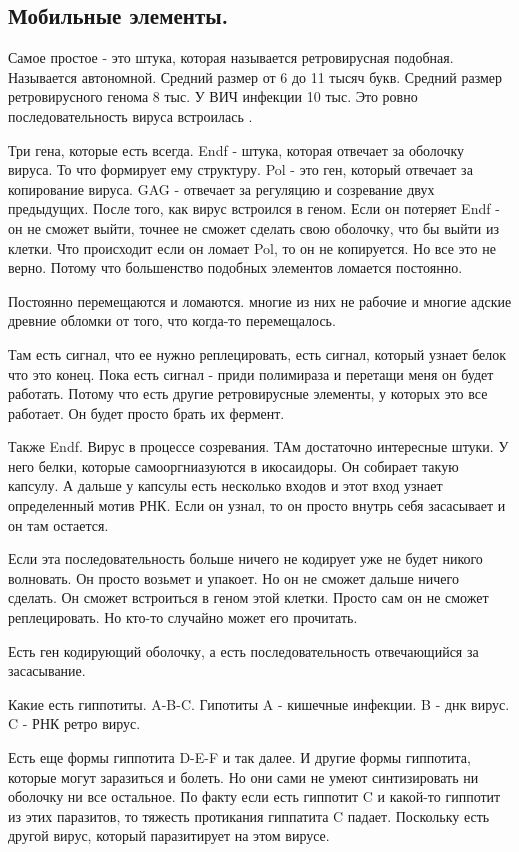 \subsection{Мобильные элементы.} 

Самое простое - это штука, которая называется 
ретровирусная подобная. Называется автономной. 
Средний размер от 6 до 11 тысяч букв. Средний 
размер ретровирусного генома 8 тыс. У ВИЧ 
инфекции 10 тыс. Это ровно последовательность 
вируса встроилась . 

Три гена, которые есть всегда. Endf - штука, 
которая отвечает за оболочку вируса. То что формирует ему структуру. 
Pol - это ген, который отвечает за копирование вируса. GAG - отвечает 
за регуляцию и созревание двух предыдущих. После того, 
как вирус встроился в геном. Если он потеряет Endf - он не 
сможет выйти, точнее не сможет сделать свою 
оболочку, что бы выйти из клетки. Что происходит если он 
ломает Pol, то он не копируется. Но все это не верно. 
Потому что большенство подобных элементов ломается постоянно. 

Постоянно перемещаются и ломаются. многие из них не рабочие и 
многие адские древние обломки от того, что когда-то перемещалось. 

Там есть сигнал, что ее нужно реплецировать, есть 
сигнал, который узнает белок что это конец. Пока есть 
сигнал - приди полимираза и перетащи меня он будет 
работать. Потому что есть другие ретровирусные элементы, 
у которых это все работает. Он будет просто брать их фермент. 

Также Endf. Вирус в процессе созревания. ТАм достаточно интересные штуки. 
У него белки, которые самооргниазуются в икосаидоры. Он собирает 
такую капсулу. А дальше у капсулы есть несколько входов и 
этот вход узнает определенный мотив РНК. Если он узнал, то 
он просто внутрь себя засасывает и он там остается. 

Если эта последовательность больше ничего не кодирует уже не будет никого волновать. 
Он просто возьмет и упакоет. 
Но он не сможет дальше ничего сделать. Он сможет встроиться в геном этой 
клетки. Просто сам он не сможет реплецировать. Но кто-то случайно может его прочитать. 

Есть ген кодирующий оболочку, а есть последовательность 
отвечающийся за засасывание. 

Какие есть гиппотиты. A-B-C. Гипотиты A - кишечные инфекции. B - днк вирус. C - РНК ретро вирус. 

Есть еще формы гиппотита D-E-F и так далее. И другие формы гиппотита, которые могут заразиться 
и болеть. Но они сами не умеют синтизировать ни оболочку ни все остальное. По факту если есть 
гиппотит C и какой-то гиппотит из этих паразитов, то тяжесть протикания гиппатита C падает. 
Поскольку есть другой вирус, который паразитирует на этом вирусе. 

